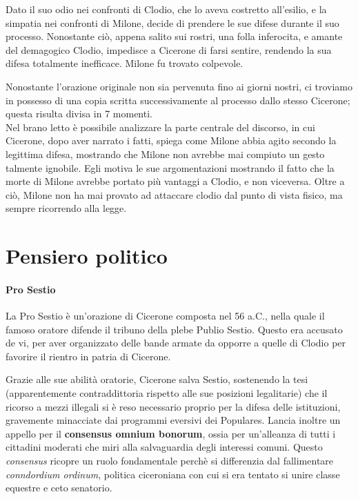 \documentclass[10pt,a4paper]{article}
\begin{document}
Dato il suo odio nei confronti di Clodio, che lo aveva costretto all'esilio, e la simpatia nei confronti di Milone, decide di prendere le sue difese durante il suo processo. Nonostante ciò, appena salito sui rostri, una folla inferocita, e amante del demagogico Clodio, impedisce a Cicerone di farsi sentire, rendendo la sua difesa totalmente inefficace. Milone fu trovato colpevole.

Nonostante l'orazione originale non sia pervenuta fino ai giorni nostri, ci troviamo in possesso di una copia scritta successivamente al processo dallo stesso Cicerone; questa risulta divisa in 7 momenti.\\

Nel brano letto è possibile analizzare la parte centrale del discorso, in cui Cicerone, dopo aver narrato i fatti, spiega come Milone abbia agito secondo la legittima difesa, mostrando che Milone non avrebbe mai compiuto un gesto talmente ignobile. Egli motiva le sue argomentazioni mostrando il fatto che la morte di Milone avrebbe portato più vantaggi a Clodio, e non viceversa. Oltre a ciò, Milone non ha mai provato ad attaccare clodio dal punto di vista fisico, ma sempre ricorrendo alla legge. 

\part*{Pensiero politico}

\subsection*{Pro Sestio}

La Pro Sestio è un'orazione di Cicerone composta nel 56 a.C., nella quale il famoso oratore difende il tribuno della plebe Publio Sestio. Questo era accusato de vi, per aver organizzato delle bande armate da opporre a quelle di Clodio per favorire il rientro in patria di Cicerone.

Grazie alle sue abilità oratorie, Cicerone salva Sestio, sostenendo la tesi (apparentemente contraddittoria rispetto alle sue posizioni legalitarie) che il ricorso a mezzi illegali si è reso necessario proprio per la difesa delle istituzioni, gravemente minacciate dai programmi eversivi dei Populares. Lancia inoltre un appello per il \textbf{consensus omnium bonorum}, ossia per un'alleanza di tutti i cittadini moderati che miri alla salvaguardia degli interessi comuni. Questo \textit{consensus} ricopre un ruolo fondamentale perchè si differenzia dal fallimentare \textit{conndordium ordinum}, politica ciceroniana con cui si era tentato si unire classe equestre e ceto senatorio.
\end{document}
